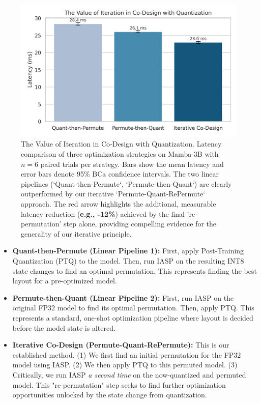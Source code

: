 \documentclass{article}
\begin{document}
\begin{figure}[htbp]
\centering
\includegraphics[width=0.8\linewidth]{figures/quantization_results_barchart.png} %
\caption{The Value of Iteration in Co-Design with Quantization. Latency comparison of three optimization strategies on Mamba-3B with $n=6$ paired trials per strategy. Bars show the mean latency and error bars denote 95\% BCa confidence intervals. The two linear pipelines (`Quant-then-Permute`, `Permute-then-Quant`) are clearly outperformed by our iterative `Permute-Quant-RePermute` approach. The red arrow highlights the additional, measurable latency reduction (\textbf{e.g., -12\%}) achieved by the final 're-permutation' step alone, providing compelling evidence for the generality of our iterative principle.}
\label{fig:quant_results}
\end{figure}

\begin{itemize}
    \item \textbf{Quant-then-Permute (Linear Pipeline 1):} First, apply Post-Training Quantization (PTQ) to the model. Then, run IASP on the resulting INT8 state changes to find an optimal permutation. This represents finding the best layout for a pre-optimized model.

    \item \textbf{Permute-then-Quant (Linear Pipeline 2):} First, run IASP on the original FP32 model to find its optimal permutation. Then, apply PTQ. This represents a standard, one-shot optimization pipeline where layout is decided before the model state is altered.

    \item \textbf{Iterative Co-Design (Permute-Quant-RePermute):} This is our established method. (1) We first find an initial permutation for the FP32 model using IASP. (2) We then apply PTQ to this permuted model. (3) Critically, we run IASP \textit{a second time} on the now-quantized and permuted model. This "re-permutation" step seeks to find further optimization opportunities unlocked by the state change from quantization.
\end{itemize}
\end{document}
